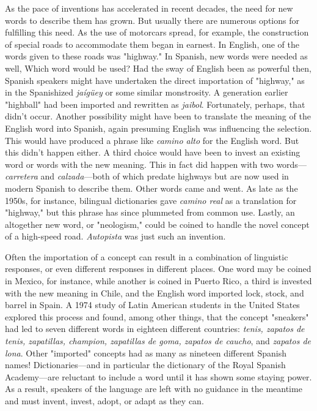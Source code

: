 As the pace of inventions has accelerated in recent decades,
the need for new words to describe them has grown. But usually there
are numerous options for fulfilling this need. As the use of motorcars
spread, for example, the construction of special roads to accommodate
them began in earnest. In English, one of the words given to these roads
was "highway." In Spanish, new words were needed as well, Which
word would be used? Had the sway of English been as powerful then,
Spanish speakers might have undertaken the direct importation of
"highway," as in the Spanishized \emph{jaígüey} or some similar monstrosity. A generation earlier "highball" had been imported and rewritten
as \emph{jaibol}. Fortunately, perhaps, that didn't occur. Another possibility
might have been to translate the meaning of the English word into
Spanish, again presuming English was influencing the selection. This
would have produced a phrase like \emph{camino alto} for the English word.
But this didn't happen either. A third choice would have been to invest
an existing word or words with the new meaning. This in fact did happen with two words---\emph{carretera} and \emph{calzada}---both of which predate
highways but are now used in modern Spanish to describe them. Other
words came and went. As late as the 1950s, for instance, bilingual
dictionaries gave \emph{camino real} as a translation for "highway," but this
phrase has since plummeted from common use. Lastly, an altogether
new word, or "neologism," could be coined to handle the novel concept of a high-speed road. \emph{Autopista} was just such an invention.

Often the importation of a concept can result in a combination
of linguistic responses, or even different responses in different places.
One word may be coined in Mexico, for instance, while another is
coined in Puerto Rico, a third is invested with the new meaning in
Chile, and the English word imported lock, stock, and barrel in Spain.
A 1974 study of Latin American students in the United States explored
this process and found, among other things, that the concept "sneakers" had led to seven different words in eighteen different countries:
\emph{tenis, zapatos de tenis, zapatillas, champion, zapatillas de goma, zapatos de caucho}, and \emph{zapatos de lona}. Other "imported" concepts had
as many as nineteen different Spanish names! Dictionaries---and in
particular the dictionary of the Royal Spanish Academy---are reluctant
to include a word until it has shown some staying power. As a result,
speakers of the language are left with no guidance in the meantime and
must invent, invest, adopt, or adapt as they can.

